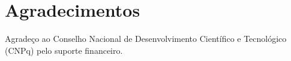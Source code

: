 \chapter*{Agradecimentos}

Agradeço ao Conselho Nacional de Desenvolvimento Científico e Tecnológico
(CNPq) pelo suporte financeiro.

